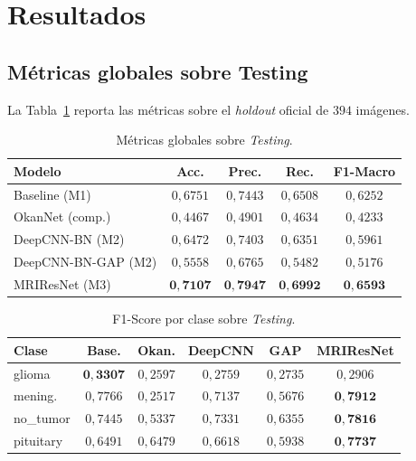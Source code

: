\documentclass[conference]{IEEEtran}
\begin{document}
\section{Resultados}
\label{sec:art-resultados}

\subsection{Métricas globales sobre Testing}

La Tabla~\ref{tab:art-metricas-global} reporta las métricas
sobre el \textit{holdout} oficial de $394$ imágenes.

\begin{table}[!t]
\centering
\caption{Métricas globales sobre \textit{Testing}.}
\label{tab:art-metricas-global}
\renewcommand{\arraystretch}{1.15}
\footnotesize
\begin{tabular}{@{}lcccc@{}}
\toprule
\textbf{Modelo} & \textbf{Acc.} & \textbf{Prec.} &
\textbf{Rec.} & \textbf{F1-Macro} \\
\midrule
Baseline (M1)         & $0{,}6751$ & $0{,}7443$ & $0{,}6508$ & $0{,}6252$ \\
OkanNet (comp.)       & $0{,}4467$ & $0{,}4901$ & $0{,}4634$ & $0{,}4233$ \\
DeepCNN-BN (M2)       & $0{,}6472$ & $0{,}7403$ & $0{,}6351$ & $0{,}5961$ \\
DeepCNN-BN-GAP (M2)   & $0{,}5558$ & $0{,}6765$ & $0{,}5482$ & $0{,}5176$ \\
MRIResNet (M3)        & $\mathbf{0{,}7107}$ & $\mathbf{0{,}7947}$ & $\mathbf{0{,}6992}$ & $\mathbf{0{,}6593}$ \\
\bottomrule
\end{tabular}
\end{table}

\begin{table}[!t]
\centering
\caption{F1-Score por clase sobre \textit{Testing}.}
\label{tab:art-f1-clase}
\renewcommand{\arraystretch}{1.15}
\footnotesize
\setlength{\tabcolsep}{3pt}
\begin{tabular}{@{}lccccc@{}}
\toprule
\textbf{Clase} & \textbf{Base.} & \textbf{Okan.} &
\textbf{DeepCNN} & \textbf{GAP} & \textbf{MRIResNet} \\
\midrule
glioma     & $\mathbf{0{,}3307}$ & $0{,}2597$ & $0{,}2759$ & $0{,}2735$ & $0{,}2906$ \\
mening.    & $0{,}7766$ & $0{,}2517$ & $0{,}7137$ & $0{,}5676$ & $\mathbf{0{,}7912}$ \\
no\_tumor  & $0{,}7445$ & $0{,}5337$ & $0{,}7331$ & $0{,}6355$ & $\mathbf{0{,}7816}$ \\
pituitary  & $0{,}6491$ & $0{,}6479$ & $0{,}6618$ & $0{,}5938$ & $\mathbf{0{,}7737}$ \\
\bottomrule
\end{tabular}
\end{table}
\end{document}
